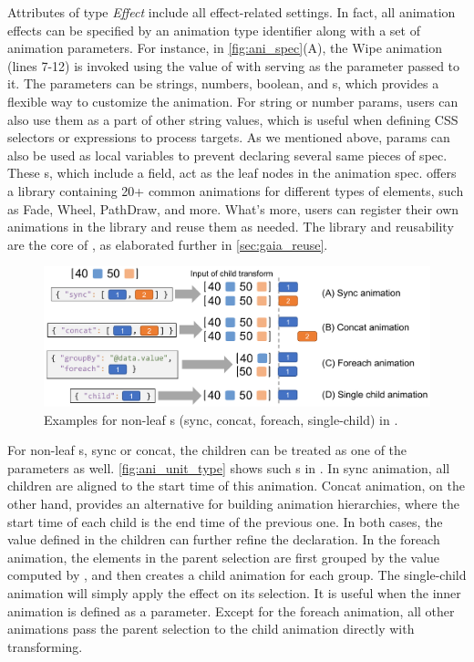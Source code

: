 Attributes of type \textit{Effect} include all effect-related settings.
In fact, all animation effects can be specified by an animation type identifier along with a set of animation parameters.
For instance, in \autoref{fig:ani_spec}(A), the Wipe animation (lines 7-12) is invoked using the value of  with  serving as the parameter passed to it. 
The parameters can be strings, numbers, boolean, and \aniunit{}s, which provides a flexible way to customize the animation.
For string or number params, users can also use them as a part of other string values, which is useful when defining CSS selectors or expressions to process targets.
As we mentioned above, params can also be used as local variables to prevent declaring several same pieces of spec.
These \aniunit{}s, which include a  field, act as the leaf nodes in the animation spec. 
\gaia{} offers a library containing 20+ common animations for different types of elements, such as Fade, Wheel, PathDraw, and more. 
What's more, users can register their own animations in the library and reuse them as needed. 
The library and reusability are the core of \gaia{}, as elaborated further in \autoref{sec:gaia_reuse}.

\begin{figure}[h]
  \centering
  \includegraphics[width=0.95\linewidth]{figs/ani_unit_type.pdf}
  \caption{
    Examples for non-leaf \aniunit{}s (sync, concat, foreach, single-child) in \gaia{}.
  }
  \label{fig:ani_unit_type}
\end{figure}

For non-leaf \aniunit{}s, \eg sync or concat, the children can be treated as one of the parameters as well.
\autoref{fig:ani_unit_type} shows such \aniunit{}s in \gaia{}.
In sync animation, all children are aligned to the start time of this animation.
Concat animation, on the other hand, provides an alternative for building animation hierarchies, where the start time of each child is the end time of the previous one.
In both cases, the  value defined in the children can further refine the declaration.
In the foreach animation, the elements in the parent selection are first grouped by the value computed by , and then \gaia{} creates a child animation for each group.
The single-child animation will simply apply the effect on its selection.
It is useful when the inner animation is defined as a parameter.
Except for the foreach animation, all other animations pass the parent selection to the child animation directly with transforming.
